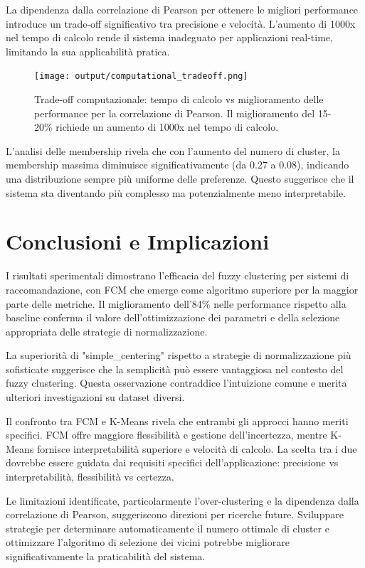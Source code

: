 La dipendenza dalla correlazione di Pearson per ottenere le migliori performance introduce un trade-off significativo tra precisione e velocità. L'aumento di 1000x nel tempo di calcolo rende il sistema inadeguato per applicazioni real-time, limitando la sua applicabilità pratica.

\begin{figure}[h]
\centering
\texttt{[image: output/computational\_tradeoff.png]}
\caption{Trade-off computazionale: tempo di calcolo vs miglioramento delle performance per la correlazione di Pearson. Il miglioramento del 15-20\% richiede un aumento di 1000x nel tempo di calcolo.}
\label{fig:computational_tradeoff}
\end{figure}

L'analisi delle membership rivela che con l'aumento del numero di cluster, la membership massima diminuisce significativamente (da 0.27 a 0.08), indicando una distribuzione sempre più uniforme delle preferenze. Questo suggerisce che il sistema sta diventando più complesso ma potenzialmente meno interpretabile.

\section{Conclusioni e Implicazioni}

I risultati sperimentali dimostrano l'efficacia del fuzzy clustering per sistemi di raccomandazione, con FCM che emerge come algoritmo superiore per la maggior parte delle metriche. Il miglioramento dell'84\% nelle performance rispetto alla baseline conferma il valore dell'ottimizzazione dei parametri e della selezione appropriata delle strategie di normalizzazione.

La superiorità di "simple\_centering" rispetto a strategie di normalizzazione più sofisticate suggerisce che la semplicità può essere vantaggiosa nel contesto del fuzzy clustering. Questa osservazione contraddice l'intuizione comune e merita ulteriori investigazioni su dataset diversi.

Il confronto tra FCM e K-Means rivela che entrambi gli approcci hanno meriti specifici. FCM offre maggiore flessibilità e gestione dell'incertezza, mentre K-Means fornisce interpretabilità superiore e velocità di calcolo. La scelta tra i due dovrebbe essere guidata dai requisiti specifici dell'applicazione: precisione vs interpretabilità, flessibilità vs certezza.

Le limitazioni identificate, particolarmente l'over-clustering e la dipendenza dalla correlazione di Pearson, suggeriscono direzioni per ricerche future. Sviluppare strategie per determinare automaticamente il numero ottimale di cluster e ottimizzare l'algoritmo di selezione dei vicini potrebbe migliorare significativamente la praticabilità del sistema.

